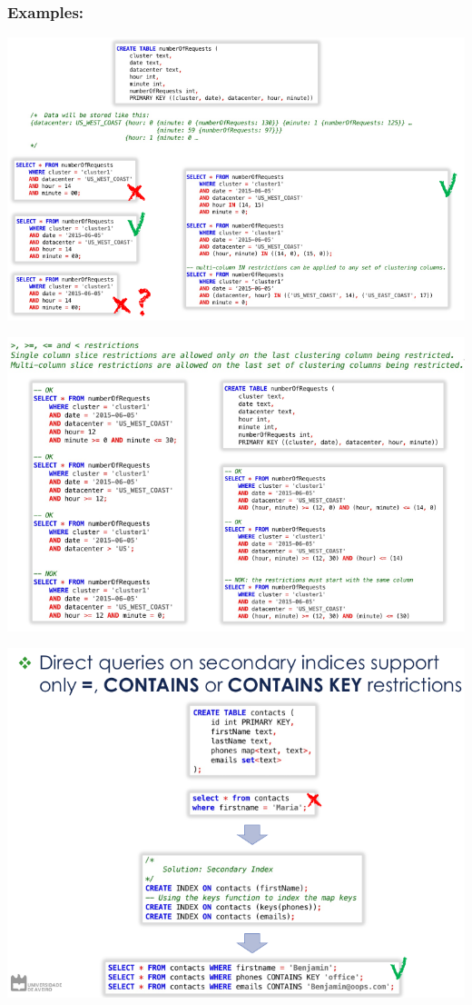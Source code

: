 \documentclass{article}
\begin{document}
\pagebreak

\subsubsection*{Examples:}

\begin{center}
  \includegraphics[scale=0.35]{29}
\end{center}

\begin{center}
  \includegraphics[scale=0.35]{30}
\end{center}

\begin{center}
  \includegraphics[scale=0.3]{31}
\end{center}
\end{document}
